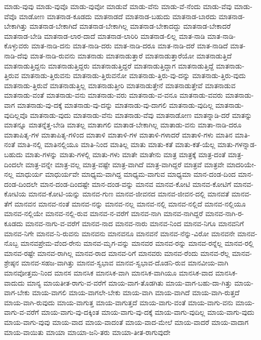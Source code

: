 {ಮಾಡು-ವುವು
ಮಾಡು-ವುವೊ
ಮಾಡು-ವುವೋ
ಮಾಡುವೆ
ಮಾಡು-ವೆನು
ಮಾಡು-ವೆ-ನೆಂದು
ಮಾಡು-ವೆವು
ಮಾಡು-ವೆವೊ
ಮಾಡೋಣ
ಮಾತನಾಡ-ಕೂಡದು
ಮಾತನಾಡದೆ
ಮಾತನಾಡ-ಬಹುದು
ಮಾತನಾಡ-ಬಾರದು
ಮಾತನಾಡ-ಬೇಕಾಗಿತ್ತು
ಮಾತನಾಡ-ಬೇಕಾಗಿದೆ
ಮಾತನಾಡ-ಬೇಕಾಗಿಲ್ಲ
ಮಾತನಾಡ-ಬೇಕಾದದ್ದು
ಮಾತನಾಡ-ಬೇಕಾದರೆ
ಮಾತನಾಡ-ಬೇಡಿ
ಮಾತನಾಡ-ಲಾರ-ದಾದೆ
ಮಾತನಾಡ-ಲಾರಿರಿ
ಮಾತನಾಡ-ಲಿಲ್ಲ
ಮಾತ-ನಾಡಿ
ಮಾತ-ನಾಡಿ-ಕೊಳ್ಳುವರು
ಮಾತ-ನಾಡಿ-ದನು
ಮಾತ-ನಾಡಿ-ದರು
ಮಾತ-ನಾಡಿ-ದರೂ
ಮಾತ-ನಾಡಿ-ದರೆ
ಮಾತ-ನಾಡಿದೆ
ಮಾತ-ನಾಡಿ-ದೆವು
ಮಾತ-ನಾಡಿ-ರುವನು
ಮಾತನಾಡು
ಮಾತನಾಡುತ್ತಾರೆ
ಮಾತನಾಡುತ್ತಾರೆಯೋ
ಮಾತನಾಡುತ್ತಿದೆ
ಮಾತನಾಡುತ್ತಿದ್ದನು
ಮಾತನಾಡುತ್ತಿದ್ದರು
ಮಾತನಾಡುತ್ತಿದ್ದರೆ
ಮಾತನಾಡುತ್ತಿದ್ದಾಗ
ಮಾತನಾಡುತ್ತಿದ್ದೆ
ಮಾತನಾಡು-ತ್ತಿರುವ
ಮಾತನಾಡು-ತ್ತಿರುವನು
ಮಾತನಾಡು-ತ್ತಿರುವನೋ
ಮಾತನಾಡು-ತ್ತಿರು-ವು-ದನ್ನು
ಮಾತನಾಡು-ತ್ತಿರು-ವುದು
ಮಾತನಾಡು-ತ್ತಿರುವೆ
ಮಾತನಾಡುತ್ತಿಲ್ಲ
ಮಾತನಾಡುತ್ತೀರಿ
ಮಾತನಾಡುತ್ತೇನೆ
ಮಾತನಾಡುತ್ತೇವೆ
ಮಾತನಾಡುವ
ಮಾತನಾಡು-ವಂತೆ
ಮಾತನಾಡು-ವನು
ಮಾತನಾಡು-ವರು
ಮಾತನಾಡು-ವ-ವನೂ
ಮಾತನಾಡು-ವವರು
ಮಾತನಾಡು-ವಾಗ
ಮಾತನಾಡು-ವು-ದಕ್ಕೆ
ಮಾತನಾಡು-ವು-ದನ್ನು
ಮಾತನಾಡು-ವು-ದಾಗಲಿ
ಮಾತನಾಡು-ವುದಿಲ್ಲ
ಮಾತನಾಡು-ವುದಿಲ್ಲವೊ
ಮಾತನಾಡು-ವುದು
ಮಾತನಾಡು-ವೆನು
ಮಾತನಾಡು-ವೆವು
ಮಾತನಾಡೋಣ
ಮಾತನ್ನಾಡಿ-ದರೆ
ಮಾತನ್ನು
ಮಾತನ್ನೂ
ಮಾತನ್ನೆತ್ತ-ಬೇಡಿ
ಮಾತಲ್ಲ
ಮಾತಾಗಲಿ
ಮಾತಾಡ-ಬೇಕಾಗಿಲ್ಲ
ಮಾತಾಡು-ವನು
ಮಾತಾ-ನಾಡಿ-ದರೂ
ಮಾತಾಪಿತೃ-ಗಳ
ಮಾತಾಪಿತೃ-ಗಳಿಂದ
ಮಾತಾಳಿ
ಮಾತಾಳಿ-ಗಳ
ಮಾತಾಳಿ-ಗಳಾದರೆ
ಮಾತಾಳಿ-ಗಳು
ಮಾತಿನ
ಮಾತಿ-ನಂತೆ
ಮಾತಿ-ನಲ್ಲಿ
ಮಾತಿನಲ್ಲಿಯೂ
ಮಾತಿ-ನಿಂದ
ಮಾತಿಲ್ಲ
ಮಾತು
ಮಾತು-ಕತೆ
ಮಾತು-ಕತೆ-ಯೆಲ್ಲ
ಮಾತು-ಗಳನ್ನಾಡ-ಬಹುದು
ಮಾತು-ಗಳನ್ನು
ಮಾತು-ಗಳಲ್ಲಿ
ಮಾತು-ಗಳು
ಮಾತೇ
ಮಾತೇನು
ಮಾತ್ರ
ಮಾತ್ರಕ್ಕೆ
ಮಾತ್ರ-ದಂತೆ
ಮಾತ್ರ-ದಿಂದಲೇ
ಮಾತ್ರ-ವನ್ನೇ
ಮಾತ್ರ-ವಲ್ಲ
ಮಾತ್ರ-ವಷ್ಟೇ
ಮಾತ್ರ-ವಾಗಿದೆ
ಮಾತ್ರ-ವಾಗಿದ್ದರೆ
ಮಾತ್ರವೆ
ಮಾತ್ರವೇ
ಮಾದರಿಯೇ-ನಲ್ಲ
ಮಾಧುರ್ಯ
ಮಾಧುರ್ಯವೇ
ಮಾಧ್ಯಮ-ವಾಗಿದ್ದ
ಮಾಧ್ಯಮ-ವಾಗುವ
ಮಾಧ್ಯಮಾ
ಮಾನ-ದಂಡ-ದಿಂದ
ಮಾನ-ದಂಡ-ದಿಂದಲೇ
ಮಾನ-ದಂಡ-ದಿಂದಷ್ಟೇ
ಮಾನ-ದಂಡ-ವನ್ನು
ಮಾನವ
ಮಾನವ-ಕೋಟಿ
ಮಾನವ-ಕೋಟಿಗೆ
ಮಾನವ-ಕೋಟಿಯ
ಮಾನವ-ಕೋಟಿ-ಯನ್ನು
ಮಾನವ-ಗುಣ
ಮಾನವ-ಜೀವನದ
ಮಾನವ-ಜೀವನ-ದಲ್ಲಿ
ಮಾನವತೆ
ಮಾನವ-ತೆಗೆ
ಮಾನವನ
ಮಾನವ-ನಂತೆ
ಮಾನವ-ನನ್ನು
ಮಾನವ-ನಲ್ಲ
ಮಾನವ-ನಲ್ಲಿ
ಮಾನವ-ನಲ್ಲಿದೆ
ಮಾನವ-ನಲ್ಲಿಯೂ
ಮಾನವ-ನಲ್ಲಿಯೇ
ಮಾನವ-ನಲ್ಲಿ-ರುವ
ಮಾನವ-ನ-ವರೆಗೆ
ಮಾನವ-ನಾಗಿ
ಮಾನವ-ನಾಗಿದ್ದರೆ
ಮಾನವ-ನಾಗಿ-ರ-ಕೂಡದು
ಮಾನವ-ನಾಗು-ವ-ವರೆಗೆ
ಮಾನವ-ನಾದ
ಮಾನವ-ನಾರು
ಮಾನವ-ನಿಂದ
ಮಾನವ-ನಿಗೂ
ಮಾನವನಿಗೆ
ಮಾನವ-ನಿಗೇ
ಮಾನವ-ನಿ-ರುವನು
ಮಾನವನು
ಮಾನವನೂ
ಮಾನವನೆ
ಮಾನವ-ನೆನ್ನು-ವಿರೋ
ಮಾನವನೇ
ಮಾನವ-ನೊಬ್ಬ
ಮಾನವಪ್ರೇಮ-ವೆಂದ-ರೇನು
ಮಾನವ-ಮೃಗ-ವನ್ನು
ಮಾನವರ
ಮಾನವ-ರನ್ನು
ಮಾನವ-ರನ್ನೆಲ್ಲ
ಮಾನವ-ರಲ್ಲಿ
ಮಾನವ-ರಷ್ಟೇ
ಮಾನವ-ರಾಗಿಲ್ಲ
ಮಾನವ-ರಾದ
ಮಾನವ-ರಿಗೆ
ಮಾನವರು
ಮಾನವ-ರೆಂದು
ಮಾನವ-ರೆಲ್ಲ
ಮಾನವ-ಶ್ರೇಷ್ಠನ
ಮಾನವ-ಸಹಜ-ವಾಗಿತ್ತು
ಮಾನವ-ಸ್ವಭಾವ
ಮಾನವ-ಸ್ವಭಾವ-ದೊಡನಿ-ರುವ
ಮಾನವೀಯ-ವಾಗಿ
ಮಾನವೋತ್ತಮ-ನಿಂದ
ಮಾನಸ
ಮಾನಸಿಕ
ಮಾನಸಿಕ-ವಾಗಿ
ಮಾನಸಿಕ-ವಾಗಿಯೂ
ಮಾನಸಿಕ-ವಾದ
ಮಾನಸಿಕ-ವಾದುದು
ಮಾನ್ಯ
ಮಾಯತೀತ-ರಾಗು-ವ-ವರೆಗೆ
ಮಾಯ-ವಾಗ-ತೊಡಗಿತು
ಮಾಯ-ವಾಗ-ಬಹು-ದಾ-ಗಿತ್ತು
ಮಾಯ-ವಾಗ-ಬೇಕು
ಮಾಯ-ವಾಗಲಿ
ಮಾಯ-ವಾಗಲೇ-ಬೇಕು
ಮಾಯ-ವಾಗಿ
ಮಾಯ-ವಾಗಿದೆ
ಮಾಯ-ವಾಗಿ-ರುತ್ತದೆ
ಮಾಯ-ವಾಗಿ-ರುವುದು
ಮಾಯ-ವಾಗುತ್ತ
ಮಾಯ-ವಾಗುತ್ತದೆ
ಮಾಯ-ವಾಗು-ವಂತೆ
ಮಾಯ-ವಾಗು-ವನು
ಮಾಯ-ವಾಗು-ವ-ವರೆಗೆ
ಮಾಯ-ವಾಗು-ವು-ದಕ್ಕಿಂತ
ಮಾಯ-ವಾಗು-ವು-ದಕ್ಕೆ
ಮಾಯ-ವಾಗು-ವುದಿಲ್ಲ
ಮಾಯ-ವಾಗು-ವುದು
ಮಾಯ-ವಾಗು-ವುವು
ಮಾಯ-ವಾದ
ಮಾಯ-ವಾದಂತೆ
ಮಾಯ-ವಾದ-ಮೇಲೆ
ಮಾಯ-ವಾದರೆ
ಮಾಯ-ವಾದಾಗ
ಮಾಯ-ವಾಯಿತು
ಮಾಯಾ
ಮಾಯಾ-ಜನಿ-ತರು
ಮಾಯಾ-ತೀತ-ರಾಗುವುದೇ
}
